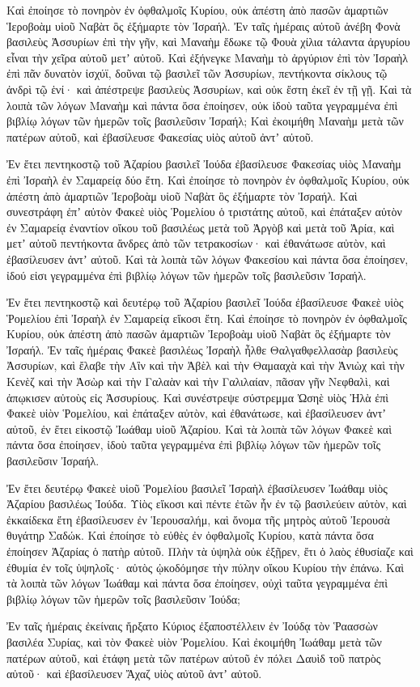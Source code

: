 {Καὶ ἐποίησε τὸ πονηρὸν ἐν ὀφθαλμοῖς Κυρίου, οὐκ ἀπέστη ἀπὸ πασῶν ἁμαρτιῶν Ἱεροβοὰμ υἱοῦ Ναβὰτ ὃς ἐξήμαρτε τὸν Ἰσραήλ.
Ἐν ταῖς ἡμέραις αὐτοῦ ἀνέβη Φονὰ βασιλεὺς Ἀσσυρίων ἐπὶ τὴν γῆν, καὶ Μαναὴμ ἔδωκε τῷ Φουὰ χίλια τάλαντα ἀργυρίου εἶναι τὴν χεῖρα αὐτοῦ μετʼ αὐτοῦ.
Καὶ ἐξήνεγκε Μαναὴμ τὸ ἀργύριον ἐπὶ τὸν Ἰσραὴλ ἐπὶ πᾶν δυνατὸν ἰσχύϊ, δοῦναι τῷ βασιλεῖ τῶν Ἀσσυρίων, πεντήκοντα σίκλους τῷ ἀνδρὶ τῷ ἑνί· καὶ ἀπέστρεψε βασιλεὺς Ἀσσυρίων, καὶ οὐκ ἔστη ἐκεῖ ἐν τῇ γῇ.
Καὶ τὰ λοιπὰ τῶν λόγων Μαναὴμ καὶ πάντα ὅσα ἐποίησεν, οὐκ ἰδοὺ ταῦτα γεγραμμένα ἐπὶ βιβλίῳ λόγων τῶν ἡμερῶν τοῖς βασιλεῦσιν Ἰσραήλ;
Καὶ ἐκοιμήθη Μαναὴμ μετὰ τῶν πατέρων αὐτοῦ, καὶ ἐβασίλευσε Φακεσίας υἱὸς αὐτοῦ ἀντʼ αὐτοῦ.
\par }{\PP {}Ἐν ἔτει πεντηκοστῷ τοῦ Ἀζαρίου βασιλεῖ Ἰούδα ἐβασίλευσε Φακεσίας υἱὸς Μαναὴμ ἐπὶ Ἰσραὴλ ἐν Σαμαρείᾳ δύο ἔτη.
Καὶ ἐποίησε τὸ πονηρὸν ἐν ὀφθαλμοῖς Κυρίου, οὐκ ἀπέστη ἀπὸ ἁμαρτιῶν Ἰεροβοὰμ υἱοῦ Ναβὰτ ὃς ἐξήμαρτε τὸν Ἰσραήλ.
Καὶ συνεστράφη ἐπʼ αὐτὸν Φακεὲ υἱὸς Ῥομελίου ὁ τριστάτης αὐτοῦ, καὶ ἐπάταξεν αὐτὸν ἐν Σαμαρείᾳ ἐναντίον οἴκου τοῦ βασιλέως μετὰ τοῦ Ἀργὸβ καὶ μετὰ τοῦ Ἀρία, καὶ μετʼ αὐτοῦ πεντήκοντα ἄνδρες ἀπὸ τῶν τετρακοσίων· καὶ ἐθανάτωσε αὐτὸν, καὶ ἐβασίλευσεν ἀντʼ αὐτοῦ.
Καὶ τὰ λοιπὰ τῶν λόγων Φακεσίου καὶ πάντα ὅσα ἐποίησεν, ἰδού εἰσι γεγραμμένα ἐπὶ βιβλίῳ λόγων τῶν ἡμερῶν τοῖς βασιλεῦσιν Ἰσραήλ.
\par }{\PP {}Ἐν ἔτει πεντηκοστῷ καὶ δευτέρῳ τοῦ Ἀζαρίου βασιλεῖ Ἰούδα ἐβασίλευσε Φακεὲ υἱὸς Ῥομελίου ἐπὶ Ἰσραὴλ ἐν Σαμαρείᾳ εἴκοσι ἔτη.
Καὶ ἐποίησε τὸ πονηρὸν ἐν ὀφθαλμοῖς Κυρίου, οὐκ ἀπέστη ἀπὸ πασῶν ἁμαρτιῶν Ἰεροβοὰμ υἱοῦ Ναβὰτ ὃς ἐξήμαρτε τὸν Ἰσραήλ.
Ἐν ταῖς ἡμέραις Φακεὲ βασιλέως Ἰσραὴλ ἦλθε Θαλγαθφελλασὰρ βασιλεὺς Ἀσσυρίων, καὶ ἔλαβε τὴν Αἲν καὶ τὴν Ἀβὲλ καὶ τὴν Θαμααχὰ καὶ τὴν Ἀνιὼχ καὶ τὴν Κενὲζ καὶ τὴν Ἀσὼρ καὶ τὴν Γαλαὰν καὶ τὴν Γαλιλαίαν, πᾶσαν γῆν Νεφθαλὶ, καὶ ἀπῳκισεν αὐτοὺς εἰς Ἀσσυρίους.
Καὶ συνέστρεψε σύστρεμμα Ὠσηὲ υἱὸς Ἠλὰ ἐπὶ Φακεὲ υἱὸν Ῥομελίου, καὶ ἐπάταξεν αὐτὸν, καὶ ἐθανάτωσε, καὶ ἐβασίλευσεν ἀντʼ αὐτοῦ, ἐν ἔτει εἰκοστῷ Ἰωάθαμ υἱοῦ Ἀζαρίου.
Καὶ τὰ λοιπὰ τῶν λόγων Φακεὲ καὶ πάντα ὅσα ἐποίησεν, ἰδοὺ ταῦτα γεγραμμένα ἐπὶ βιβλίῳ λόγων τῶν ἡμερῶν τοῖς βασιλεῦσιν Ἰσραήλ.
\par }{\PP {}Ἐν ἔτει δευτέρῳ Φακεὲ υἱοῦ Ῥομελίου βασιλεῖ Ἰσραὴλ ἐβασίλευσεν Ἰωάθαμ υἱὸς Ἀζαρίου βασιλέως Ἰούδα.
Υἱὸς εἴκοσι καὶ πέντε ἐτῶν ἦν ἐν τῷ βασιλεύειν αὐτὸν, καὶ ἐκκαίδεκα ἔτη ἐβασίλευσεν ἐν Ἱερουσαλήμ, καὶ ὄνομα τῆς μητρὸς αὐτοῦ Ἰερουσὰ θυγάτηρ Σαδώκ.
Καὶ ἐποίησε τὸ εὐθὲς ἐν ὀφθαλμοῖς Κυρίου, κατὰ πάντα ὅσα ἐποίησεν Ἀζαρίας ὁ πατὴρ αὐτοῦ.
Πλὴν τὰ ὑψηλὰ οὐκ ἐξῇρεν, ἔτι ὁ λαὸς ἐθυσίαζε καὶ ἐθυμία ἐν τοῖς ὑψηλοῖς· αὐτὸς ᾠκοδόμησε τὴν πύλην οἴκου Κυρίου τὴν ἐπάνω.
Καὶ τὰ λοιπὰ τῶν λόγων Ἰωάθαμ καὶ πάντα ὅσα ἐποίησεν, οὐχὶ ταῦτα γεγραμμένα ἐπὶ βιβλίῳ λόγων τῶν ἡμερῶν τοῖς βασιλεῦσιν Ἰούδα;
\par }{\PP {}Ἐν ταῖς ἡμέραις ἐκείναις ἤρξατο Κύριος ἐξαποστέλλειν ἐν Ἰούδᾳ τὸν Ῥαασσὼν βασιλέα Συρίας, καὶ τὸν Φακεὲ υἱὸν Ῥομελίου.
Καὶ ἐκοιμήθη Ἰωάθαμ μετὰ τῶν πατέρων αὐτοῦ, καὶ ἐτάφη μετὰ τῶν πατέρων αὐτοῦ ἐν πόλει Δαυὶδ τοῦ πατρὸς αὐτοῦ· καὶ ἐβασίλευσεν Ἄχαζ υἱὸς αὐτοῦ ἀντʼ αὐτοῦ.

}
